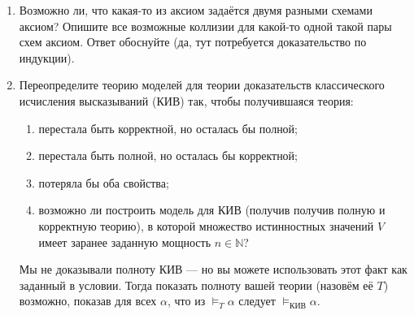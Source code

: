 \documentclass[10pt,a4paper,oneside]{article}
\begin{document}
\begin{enumerate}
\item Возможно ли, что какая-то из аксиом задаётся двумя разными схемами аксиом? Опишите все возможные коллизии для какой-то одной такой пары схем аксиом.
Ответ обоснуйте (да, тут потребуется доказательство по индукции).

\item Переопределите теорию моделей для теории доказательств классического исчисления высказываний (КИВ) так, чтобы получившаяся теория:
\begin{enumerate}
\item перестала быть корректной, но осталась бы полной;
\item перестала быть полной, но осталась бы корректной;
\item потеряла бы оба свойства;
\item возможно ли построить модель для КИВ (получив получив полную и корректную теорию), в которой множество истинностных значений $V$ имеет 
заранее заданную мощность $n \in \mathbb{N}$?
\end{enumerate}
Мы не доказывали полноту КИВ --- но вы можете использовать этот факт как заданный в условии. Тогда показать полноту вашей теории (назовём её $T$)
возможно, показав для всех $\alpha$, что из $\models_T \alpha$ следует $\models_\text{КИВ}\alpha$.
\end{enumerate}
\end{document}
